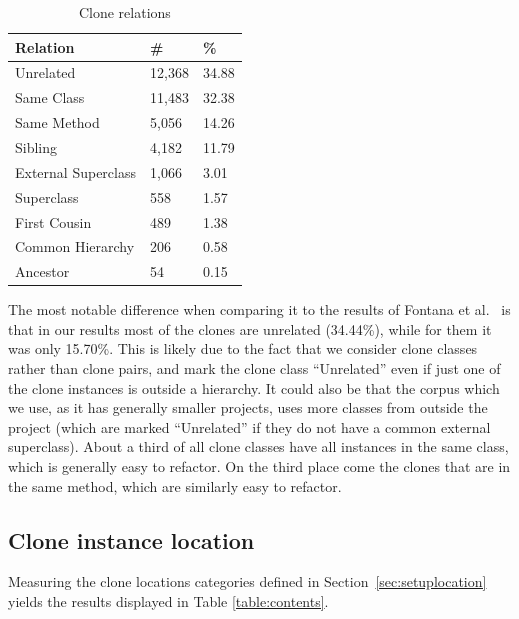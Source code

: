 \begin{table}[H]
  \begin{center}
  \caption{Clone relations} \label{table:relations}
  \medskip
\begin{tabular}{|l|l|l|} \hline
\textbf{Relation} & \textbf{\#} & \textbf{\%} \\ \hline
Unrelated          & 12,368 & 34.88            \\ \hline
Same Class          & 11,483 & 32.38             \\ \hline
Same Method               & 5,056 & 14.26            \\ \hline
Sibling         & 4,182 & 11.79             \\ \hline
External Superclass   & 1,066 & 3.01             \\ \hline
Superclass          & 558 & 1.57           \\ \hline
First Cousin          & 489 & 1.38           \\ \hline
Common Hierarchy    & 206 & 0.58            \\ \hline
Ancestor          & 54 & 0.15          \\ \hline
\end{tabular}
\end{center}
\end{table}

The most notable difference when comparing it to the results of Fontana et al.~\cite{fontana2015duplicated} is that in our results most of the clones are unrelated (34.44\%), while for them it was only 15.70\%. This is likely due to the fact that we consider clone classes rather than clone pairs, and mark the clone class ``Unrelated'' even if just one of the clone instances is outside a hierarchy. It could also be that the corpus which we use, as it has generally smaller projects, uses more classes from outside the project (which are marked ``Unrelated'' if they do not have a common external superclass). About a third of all clone classes have all instances in the same class, which is generally easy to refactor. On the third place come the clones that are in the same method, which are similarly easy to refactor.

\subsection{Clone instance location}\label{chap:clonelocation}
Measuring the clone locations categories defined in Section~\ref{sec:setuplocation} yields the results displayed in Table \ref{table:contents}.

